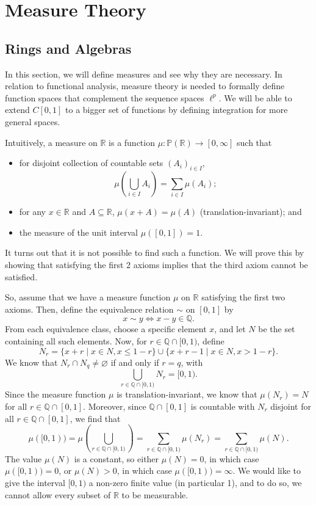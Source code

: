 \documentclass[a4paper, openany]{memoir}
\theoremstyle{definition}
\theoremstyle{plain}
\begin{document}
    \chapter{Measure Theory}
    \section{Rings and Algebras}
    In this section, we will define measures and see why they are necessary. In relation to functional analysis, measure theory is needed to formally define function spaces that complement the sequence spaces $\ell^p$. We will be able to extend $C[0, 1]$ to a bigger set of functions by defining integration for more general spaces.

    Intuitively, a measure on $\mathbb{R}$ is a function $\mu \colon \mathbb{P}(\mathbb{R}) \to [0, \infty]$ such that
    \begin{itemize}
        \item for disjoint collection of countable sets $(A_i)_{i \in I}$,
        \[\mu \left(\bigcup_{i \in I} A_i\right) = \sum_{i \in I} \mu(A_i);\]
        \item for any $x \in \mathbb{R}$ and $A \subseteq \mathbb{R}$, $\mu(x + A) = \mu(A)$ (translation-invariant); and
        \item the measure of the unit interval $\mu([0, 1]) = 1$.
    \end{itemize}
    It turns out that it is not possible to find such a function. We will prove this by showing that satisfying the first 2 axioms implies that the third axiom cannot be satisfied.

    So, assume that we have a measure function $\mu$ on $\mathbb{R}$ satisfying the first two axioms. Then, define the equivalence relation $\sim$ on $[0, 1]$ by 
    \[x \sim y \iff x - y \in \mathbb{Q}.\]
    From each equivalence class, choose a specific element $x$, and let $N$ be the set containing all such elements. Now, for $r \in \mathbb{Q} \cap [0, 1)$, define
    \[N_r = \{x + r \mid x \in N, x \leq 1 - r\} \cup \{x + r - 1 \mid x \in N, x > 1 - r\}.\]
    We know that $N_r \cap N_q \neq \varnothing$ if and only if $r = q$, with
    \[\bigcup_{r \in \mathbb{Q} \cap [0, 1)} N_r = [0, 1).\]
    Since the measure function $\mu$ is translation-invariant, we know that $\mu(N_r) = N$ for all $r \in \mathbb{Q} \cap [0, 1]$. Moreover, since $\mathbb{Q} \cap [0, 1]$ is countable with $N_r$ disjoint for all $r \in \mathbb{Q} \cap [0, 1]$, we find that
    \[\mu([0, 1)) = \mu \left(\bigcup_{r \in \mathbb{Q} \cap [0, 1)}\right) = \sum_{r \in \mathbb{Q} \cap [0, 1)} \mu(N_r) = \sum_{r \in \mathbb{Q} \cap [0, 1)} \mu(N).\]
    The value $\mu(N)$ is a constant, so either $\mu(N) = 0$, in which case $\mu([0, 1)) = 0$, or $\mu(N) > 0$, in which case $\mu([0, 1)) = \infty$. We would like to give the interval $[0, 1)$ a non-zero finite value (in particular 1), and to do so, we cannot allow every subset of $\mathbb{R}$ to be measurable.
\end{document}
